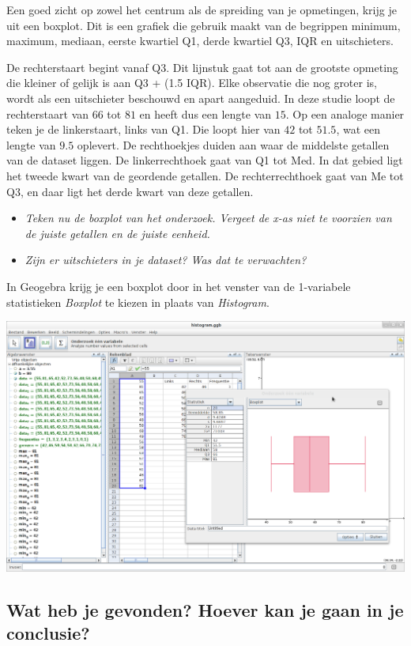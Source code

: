 \documentclass[11pt]{article}
\newcommand{\vraag}[2]{\begin{itemize}\item {\it #1} \vspace*{#2}\end{itemize}}
\begin{document}
Een goed zicht op zowel het centrum als de spreiding van je opmetingen, krijg je uit een boxplot. Dit
is een grafiek die gebruik maakt van de begrippen minimum, maximum, mediaan, eerste kwartiel
Q1, derde kwartiel Q3, IQR en uitschieters.

De rechterstaart begint vanaf Q3. Dit lijnstuk gaat tot aan de grootste opmeting die kleiner of
gelijk is aan Q3 + (1.5 IQR). Elke observatie die nog groter is, wordt als een uitschieter
beschouwd en apart aangeduid. In deze studie loopt de rechterstaart van $66$ tot $81$ en heeft
dus een lengte van $15$. Op een analoge manier teken je de linkerstaart, links van Q1. Die
loopt hier van $42$ tot $51.5$, wat een lengte van $9.5$ oplevert.
De rechthoekjes duiden aan waar de middelste getallen van de dataset liggen. De
linkerrechthoek gaat van Q1 tot Med. In dat gebied ligt het tweede kwart van de geordende
getallen. De rechterrechthoek gaat van Me tot Q3, en daar ligt het derde kwart van deze
getallen.

\vraag{Teken nu de boxplot van het onderzoek. Vergeet de x-as niet te voorzien van de juiste getallen en de juiste
eenheid.}{4cm}

\vraag{Zijn er uitschieters in je dataset? Was dat te verwachten?}{3cm}

In Geogebra krijg je een boxplot door in het venster van de 1-variabele statistieken {\it Boxplot} te kiezen in plaats van {\it Histogram}.

\begin{center}
  \includegraphics[width=14cm]{gg-boxplot}  
\end{center}

\subsection{Wat heb je gevonden? Hoever kan je gaan in je conclusie?}
\end{document}

